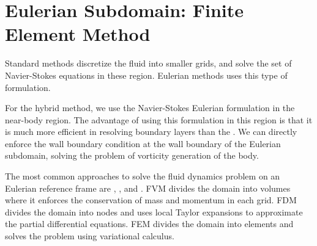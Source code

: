 \chapter{Eulerian Subdomain: Finite Element Method}
\label{ch:eulerian}

%	

Standard  methods discretize the fluid into smaller grids, and solve the set of Navier-Stokes equations in these region. Eulerian methods uses this type of formulation.

For the hybrid method, we use the Navier-Stokes Eulerian formulation in the near-body region. The advantage of using this formulation in this region is that it is much more efficient in resolving boundary layers than the . We can directly enforce the wall boundary condition at the wall boundary of the Eulerian subdomain, solving the problem of vorticity generation of the body. %

The most common approaches to solve the fluid dynamics problem on an Eulerian reference frame are , , and . FVM divides the domain into volumes where it enforces the conservation of mass and momentum in each grid. FDM divides the domain into nodes and uses local Taylor expansions to approximate the partial differential equations. FEM divides the domain into elements and solves the problem using variational calculus. %

